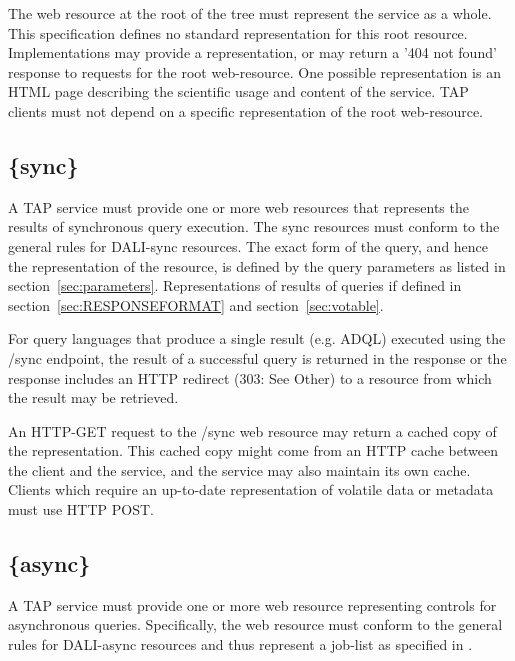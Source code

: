 \documentclass[11pt,letter]{ivoa}
\begin{document}
The web resource at the root of the tree must represent the service as a whole. 
This specification defines no standard representation for this root resource. 
Implementations may provide a representation, or may return a '404 not found' 
response to requests for the root web-resource. One possible representation is 
an HTML page describing the scientific usage and content of the service. TAP 
clients must not depend on a specific representation of the root web-resource.

\subsection{\{sync\}}
\label{sec:tap-sync}

A TAP service must provide one or more web resources that represents the results 
of synchronous query execution. The {sync} resources must conform to the general rules for
DALI-sync \citep{std:DALI} resources. The exact form of the query, and hence the 
representation of the resource, is defined by the  query parameters as listed in 
section~\ref{sec:parameters}. Representations of results of queries if defined in 
section~\ref{sec:RESPONSEFORMAT} and section~\ref{sec:votable}.

For query languages that produce a single result (e.g. ADQL) executed using the 
/sync endpoint, the result of a successful query is returned in the response or 
the response includes an HTTP redirect (303: See Other) to a resource from 
which the result may be retrieved.

An HTTP-GET request to the /sync web resource may return a cached copy of the 
representation. This cached copy might come from an HTTP cache between the 
client and the service, and the service may also maintain its own cache. Clients 
which require an up-to-date representation of volatile data or metadata must use 
HTTP POST.

\subsection{\{async\}}
\label{sec:tap-async}

A TAP service must provide one or more web resource representing controls for 
asynchronous queries. Specifically, the web resource must conform to the general rules
for DALI-async \citep{std:DALI} resources and thus represent a job-list 
as specified in \citep{std:UWS}.
\end{document}
